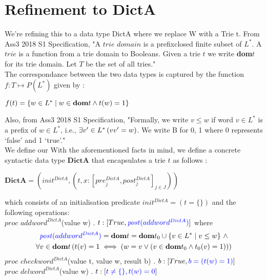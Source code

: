 \documentclass[a4paper,11pt,fleqn]{scrartcl}
\newcommand{\post}{\mathit{post}}
\newcommand{\DictA}{\mathbf{DictA}}
\newcommand{\domt}{\mathbf{dom}t}
\newcommand{\domto}{\mathbf{dom}t_{0}}
\begin{document}
\section{Refinement to DictA}
\label{sec:task-2}
We’re refining this to a data type DictA where we replace W with a Trie t. From Ass3 2018 S1 Specification, "A $trie$ $domain$ is a prefixclosed finite subset of $L^*$. A $trie$ is a function from a trie domain to Booleans. Given a trie $t$ we write \textbf{dom}$t$ for its trie domain. Let $T$ be the set of all tries."\\ 
The correspondance between the two data types is captured by the function $f : T \mapsto P(L^*)$ given by :
\begin{center}$f(t) = \{w\in L^* \mid w \in \textbf{dom}t \wedge t(w)=1\}$\end{center}
Also, from Ass3 2018 S1 Specification, "Formally, we write $v\leq w$ if word $v\in L^*$ is a prefix of $w\in L^*$, i.e., $\exists v'\in L^*\left(vv' = w\right)$. We write B for {0, 1} where 0 represents ‘false’ and 1 ‘true’."\\
We define our 
With the aforementioned facts in mind, we define a concrete syntactic data type $\DictA$ that encapsulates a trie $t$ as follows :
\begin{center}$\DictA = (init^{DictA} , (t,x : [pre_{j}^{DictA}, post_{j}^{DictA}]_{j\in J}))$\end{center}
which consists of an  initialisation predicate \color{blue}$init^{DictA} = (t = \{ \})$ \color{black} and the following operations:\\
$proc$ $addword^{DictA}$(value w) . $t : [True, \color{blue}\post(addword^{DictA})\color{black}]$ where
\begin{gather*}
\color{blue}\post(addword^{DictA})\color{black} = \domt = \domto \cup \{v\in L^* \mid v\leq w\}\text{ }\And \\
\All{v\in \domt}{t(v) = 1 \iff (w=v \Or (v\in \domto \And t_0(v) = 1))}
\end{gather*}
$proc$ $checkword^{DictA}$(value t, value w, result b) . $b : [True, \color{blue}b = (t(w) = 1)\color{black}]$\\
$proc$ $delword^{DictA}$(value w) . $t : [\color{blue}t\neq \{ \}, t(w) = 0\color{black}]$\\
\end{document}

